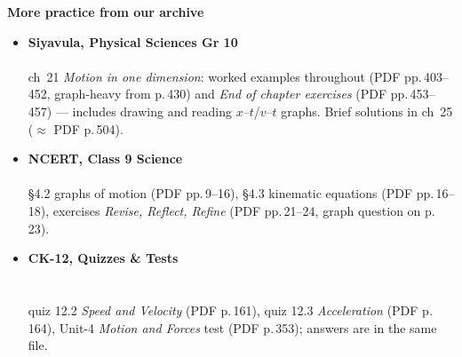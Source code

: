 \documentclass[11pt,a4paper]{article}
\newcommand{\nsec}[1]{\vspace{9pt}\par{\color{accent}\large\bfseries #1}\par\vspace{2pt}}
\begin{document}
\nsec{More practice from our archive}
\begin{itemize}[leftmargin=1.2em, itemsep=3pt, topsep=2pt]
  \item \textbf{Siyavula, Physical Sciences Gr 10}\\
        {\small{}}\\
        {\small ch~21 \emph{Motion in one dimension}: worked examples throughout
        (PDF pp.\,403--452, graph-heavy from p.\,430) and \emph{End of chapter exercises}
        (PDF pp.\,453--457) --- includes drawing and reading $x$--$t$/$v$--$t$ graphs.
        Brief solutions in ch~25 ($\approx$ PDF p.\,504).}
  \item \textbf{NCERT, Class 9 Science}\\
        {\small{}}\\
        {\small \S4.2 graphs of motion (PDF pp.\,9--16), \S4.3 kinematic equations
        (PDF pp.\,16--18), exercises \emph{Revise, Reflect, Refine} (PDF pp.\,21--24,
        graph question on p.\,23).}
  \item \textbf{CK-12, Quizzes \& Tests}\\
        {\small{}\\
        }\\
        {\small quiz 12.2 \emph{Speed and Velocity} (PDF p.\,161), quiz 12.3
        \emph{Acceleration} (PDF p.\,164), Unit-4 \emph{Motion and Forces} test
        (PDF p.\,353); answers are in the same file.}
\end{itemize}
\fi
\end{document}
